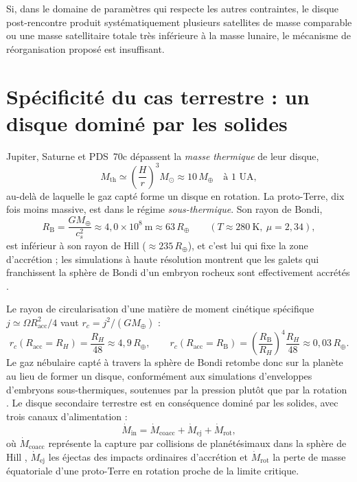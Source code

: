 \documentclass[11pt,a4paper,openany]{report}
\newcommand{\Mt}{M_{\oplus}}
\newcommand{\Rt}{R_{\oplus}}
\begin{document}
\begin{falsif}
Si, dans le domaine de paramètres qui respecte les autres contraintes, le disque post-rencontre
produit systématiquement plusieurs satellites de masse comparable ou une masse satellitaire
totale très inférieure à la masse lunaire, le mécanisme de réorganisation proposé est
insuffisant.
\end{falsif}

\section{Spécificité du cas terrestre : un disque dominé par les solides}
\label{sec:soustherm}

Jupiter, Saturne et PDS~70c dépassent la \emph{masse thermique} de leur disque,
\begin{equation}
M_{\mathrm{th}}\simeq\left(\frac{H}{r}\right)^{3}M_\odot\approx10\,\Mt
\quad\text{à 1 UA},
\label{eq:Mth}
\end{equation}
au-delà de laquelle le gaz capté forme un disque en rotation. La proto-Terre, dix fois moins
massive, est dans le régime \emph{sous-thermique}. Son rayon de Bondi,
\begin{equation}
R_{\mathrm{B}}=\frac{G\Mt}{c_s^2}\approx4{,}0\times10^{8}\ \mathrm{m}\approx63\,\Rt
\qquad(T\approx280\ \mathrm{K},\ \mu=2{,}34),
\label{eq:Bondi}
\end{equation}
est inférieur à son rayon de Hill ($\approx235\,\Rt$), et c'est lui qui fixe la zone
d'accrétion ; les simulations à haute résolution montrent que les galets qui franchissent la
sphère de Bondi d'un embryon rocheux sont effectivement accrétés \cite{Popovas2018}.

Le rayon de circularisation d'une matière de moment cinétique spécifique
$j\simeq\Omega R_{\mathrm{acc}}^2/4$ vaut $r_c=j^2/(G\Mt)$ \cite{QuillenTrilling1998} :
\begin{equation}
r_c(R_{\mathrm{acc}}=R_H)=\frac{R_H}{48}\approx4{,}9\,\Rt,
\qquad
r_c(R_{\mathrm{acc}}=R_{\mathrm{B}})=\left(\frac{R_{\mathrm{B}}}{R_H}\right)^{4}
\frac{R_H}{48}\approx0{,}03\,\Rt.
\label{eq:rc}
\end{equation}
Le gaz nébulaire capté à travers la sphère de Bondi retombe donc sur la planète au lieu de
former un disque, conformément aux simulations d'enveloppes d'embryons sous-thermiques,
soutenues par la pression plutôt que par la rotation \cite{Ormel2015,Fung2015}. Le disque
secondaire terrestre est en conséquence dominé par les solides, avec trois canaux
d'alimentation :
\begin{equation}
\dot M_{\mathrm{in}}=\dot M_{\mathrm{coacc}}+\dot M_{\mathrm{ej}}+\dot M_{\mathrm{rot}},
\label{eq:canaux}
\end{equation}
où $\dot M_{\mathrm{coacc}}$ représente la capture par collisions de planétésimaux dans la sphère
de Hill \cite{Ruskol1960,Weidenschilling1986}, $\dot M_{\mathrm{ej}}$ les éjectas des impacts
ordinaires d'accrétion et $\dot M_{\mathrm{rot}}$ la perte de masse équatoriale d'une proto-Terre
en rotation proche de la limite critique.
\end{document}
